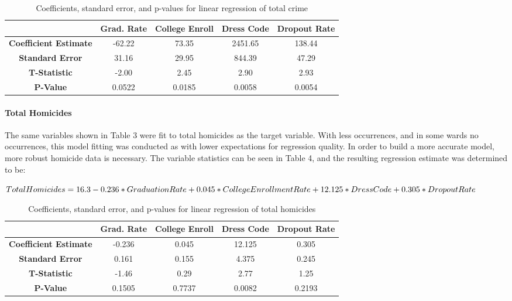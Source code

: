 \documentclass[12pt]{article}
\begin{document}
\begin{center}
	\begin{table}[h]
		\begin{tabular}{ c | c | c | c | c }
			
			& \textbf{Grad. Rate} & \textbf{College Enroll} & \textbf{Dress Code} & \textbf{Dropout Rate} \\
			\hline
			\textbf{Coefficient Estimate} & -62.22 & 73.35 & 2451.65 & 138.44 \\
			\textbf{Standard Error} & 31.16 & 29.95 & 844.39 & 47.29 \\
			\textbf{T-Statistic} & -2.00 & 2.45 & 2.90 & 2.93\\
			\textbf{P-Value} & 0.0522 & 0.0185 & 0.0058 & 0.0054		
		\end{tabular}
		\caption{Coefficients, standard error, and p-values for linear regression of total crime}
	\end{table}
\end{center}

\paragraph{Total Homicides}

The same variables shown in Table 3 were fit to total homicides as the target variable.  With less occurrences, and in some wards no occurrences, this model fitting was conducted as with lower expectations for regression quality.  In order to build a more accurate model, more robust homicide data is necessary.  The variable statistics can be seen in Table 4, and the resulting regression estimate was determined to be:
\\
\begin{center}
\begin{math}
TotalHomicides = 16.3 - 0.236*GraduationRate + 0.045*CollegeEnrollmentRate + 12.125*DressCode + 0.305*DropoutRate $$
\end{math}
\end{center}

\begin{center}
	\begin{table}[h]
		\begin{tabular}{ c | c | c | c | c }
			
			& \textbf{Grad. Rate} & \textbf{College Enroll} & \textbf{Dress Code} & \textbf{Dropout Rate} \\
			\hline
			\textbf{Coefficient Estimate} & -0.236 & 0.045 & 12.125 & 0.305 \\
			\textbf{Standard Error} & 0.161 & 0.155 & 4.375 & 0.245 \\
			\textbf{T-Statistic} & -1.46 & 0.29 & 2.77 & 1.25\\
			\textbf{P-Value} & 0.1505 & 0.7737 & 0.0082 & 0.2193		
		\end{tabular}
		\caption{Coefficients, standard error, and p-values for linear regression of total homicides}
	\end{table}
\end{center}
\end{document}
